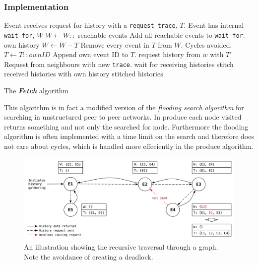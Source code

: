 	\subsubsection{Implementation}
	\begin{algorithm}
	\begin{algorithmic}
		\State Event receives request for history with a \texttt{request trace}, $T$.
		\State Event has internal \texttt{wait for}, $W$
		\State
		\State $W\gets W::$ reachable events \Comment Add all reachable events to \texttt{wait for}.
			\Return own history
		\Else
			\State $W\gets W-T$ \Comment Remove every event in $T$ from $W$. Cycles avoided.
			\State $T\gets T::ownID$ \Comment Append own event ID to $T$.
			\State
				\State request history from $w$ with $T$ \Comment Request from neighbours with new \texttt{trace}.
			\EndFor
			\State wait for receiving histories
			\State stitch received histories with own history
			\State
			\Return stitched histories
		\EndIf
	\end{algorithmic}
	\caption{The \textit{\textbf{Fetch}} algorithm}
	\label{alg:fetch}
	\end{algorithm}
	
	\newpar This algorithm is in fact a modified version of the \textit{flooding search algorithm}  for searching in unstructured peer to peer networks. In produce each node visited returns something and not only the searched for node. Furthermore the flooding algorithm is often implemented with a time limit on the search and therefore does not care about cycles, which is handled more effeciently in the produce algorithm.
	
	\begin{figure}[H]
		\centering
		\includegraphics[width=\textwidth]{4connect/images/recursive.pdf}
		\caption{An illustration showing the recursive traversal through a graph. Note the avoidance of creating a deadlock.}
		\label{fig:connecting:recursive}
	\end{figure}
	
